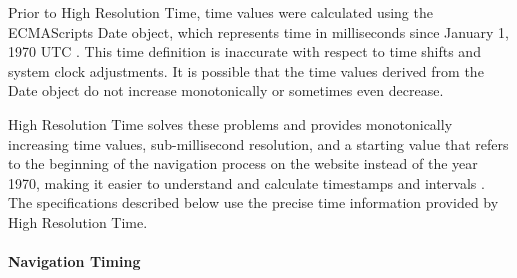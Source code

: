 
Prior to High Resolution Time, time values were calculated using the ECMAScripts Date object, which represents time in milliseconds since January 1, 1970 UTC \cite{2021Ecma}.
This time definition is inaccurate with respect to time shifts and system clock adjustments.
It is possible that the time values derived from the Date object do not increase monotonically or sometimes even decrease.

High Resolution Time solves these problems and provides monotonically increasing time values, sub-millisecond resolution, and a starting value that refers to the beginning of the navigation process on the website instead of the year 1970, making it easier to understand and calculate timestamps and intervals \cite{2021W3CHRTime}.
The specifications described below use the precise time information provided by High Resolution Time.






	








\paragraph{Navigation Timing} %

